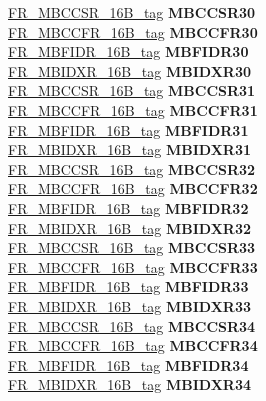 \begin{DoxyCompactItemize}
\begin{tabbing}
\>\>\mbox{\hyperlink{unionFR__MBCCSR__16B__tag}{FR\_MBCCSR\_16B\_tag}} {\bfseries MBCCSR30}\\
\>\>\mbox{\hyperlink{unionFR__MBCCFR__16B__tag}{FR\_MBCCFR\_16B\_tag}} {\bfseries MBCCFR30}\\
\>\>\mbox{\hyperlink{unionFR__MBFIDR__16B__tag}{FR\_MBFIDR\_16B\_tag}} {\bfseries MBFIDR30}\\
\>\>\mbox{\hyperlink{unionFR__MBIDXR__16B__tag}{FR\_MBIDXR\_16B\_tag}} {\bfseries MBIDXR30}\\
\>\>\mbox{\hyperlink{unionFR__MBCCSR__16B__tag}{FR\_MBCCSR\_16B\_tag}} {\bfseries MBCCSR31}\\
\>\>\mbox{\hyperlink{unionFR__MBCCFR__16B__tag}{FR\_MBCCFR\_16B\_tag}} {\bfseries MBCCFR31}\\
\>\>\mbox{\hyperlink{unionFR__MBFIDR__16B__tag}{FR\_MBFIDR\_16B\_tag}} {\bfseries MBFIDR31}\\
\>\>\mbox{\hyperlink{unionFR__MBIDXR__16B__tag}{FR\_MBIDXR\_16B\_tag}} {\bfseries MBIDXR31}\\
\>\>\mbox{\hyperlink{unionFR__MBCCSR__16B__tag}{FR\_MBCCSR\_16B\_tag}} {\bfseries MBCCSR32}\\
\>\>\mbox{\hyperlink{unionFR__MBCCFR__16B__tag}{FR\_MBCCFR\_16B\_tag}} {\bfseries MBCCFR32}\\
\>\>\mbox{\hyperlink{unionFR__MBFIDR__16B__tag}{FR\_MBFIDR\_16B\_tag}} {\bfseries MBFIDR32}\\
\>\>\mbox{\hyperlink{unionFR__MBIDXR__16B__tag}{FR\_MBIDXR\_16B\_tag}} {\bfseries MBIDXR32}\\
\>\>\mbox{\hyperlink{unionFR__MBCCSR__16B__tag}{FR\_MBCCSR\_16B\_tag}} {\bfseries MBCCSR33}\\
\>\>\mbox{\hyperlink{unionFR__MBCCFR__16B__tag}{FR\_MBCCFR\_16B\_tag}} {\bfseries MBCCFR33}\\
\>\>\mbox{\hyperlink{unionFR__MBFIDR__16B__tag}{FR\_MBFIDR\_16B\_tag}} {\bfseries MBFIDR33}\\
\>\>\mbox{\hyperlink{unionFR__MBIDXR__16B__tag}{FR\_MBIDXR\_16B\_tag}} {\bfseries MBIDXR33}\\
\>\>\mbox{\hyperlink{unionFR__MBCCSR__16B__tag}{FR\_MBCCSR\_16B\_tag}} {\bfseries MBCCSR34}\\
\>\>\mbox{\hyperlink{unionFR__MBCCFR__16B__tag}{FR\_MBCCFR\_16B\_tag}} {\bfseries MBCCFR34}\\
\>\>\mbox{\hyperlink{unionFR__MBFIDR__16B__tag}{FR\_MBFIDR\_16B\_tag}} {\bfseries MBFIDR34}\\
\>\>\mbox{\hyperlink{unionFR__MBIDXR__16B__tag}{FR\_MBIDXR\_16B\_tag}} {\bfseries MBIDXR34}\\

\end{tabbing}
\end{DoxyCompactItemize}
